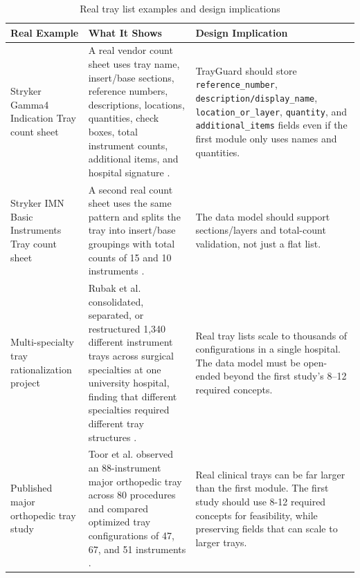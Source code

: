 \documentclass[10pt,a4paper]{article}
\begin{document}
\begin{table}[H]
\centering
\caption{Real tray list examples and design implications}
\label{tab:app-real-tray-examples}
\small\renewcommand{\arraystretch}{1.2}\setlength{\tabcolsep}{4pt}
\begin{tabularx}{\textwidth}{|>{\raggedright\arraybackslash}X|>{\raggedright\arraybackslash}X|>{\raggedright\arraybackslash}X|}
\hline
Real Example & What It Shows & Design Implication \\
\hline
Stryker Gamma4 Indication Tray count sheet & A real vendor count sheet uses tray name, insert/base sections, reference numbers, descriptions, locations, quantities, check boxes, total instrument counts, additional items, and hospital signature \cite{stryker-gamma4-count-sheet-2023}. & TrayGuard should store \texttt{reference\_number}, \texttt{description/display\_name}, \texttt{location\_or\_layer}, \texttt{quantity}, and \texttt{additional\_items} fields even if the first module only uses names and quantities. \\
\hline
Stryker IMN Basic Instruments Tray count sheet & A second real count sheet uses the same pattern and splits the tray into insert/base groupings with total counts of 15 and 10 instruments \cite{stryker-imn-count-sheet-2023}. & The data model should support sections/layers and total-count validation, not just a flat list. \\
\hline
Multi-specialty tray rationalization project & Rubak et al. consolidated, separated, or restructured 1{,}340 different instrument trays across surgical specialties at one university hospital, finding that different specialties required different tray structures \cite{rubak-et-al-2024}. & Real tray lists scale to thousands of configurations in a single hospital. The data model must be open-ended beyond the first study's 8--12 required concepts. \\
\hline
Published major orthopedic tray study & Toor et al. observed an 88-instrument major orthopedic tray across 80 procedures and compared optimized tray configurations of 47, 67, and 51 instruments \cite{toor-et-al-2022}. & Real clinical trays can be far larger than the first module. The first study should use 8-12 required concepts for feasibility, while preserving fields that can scale to larger trays. \\
\hline
\end{tabularx}
\end{table}

\end{document}
